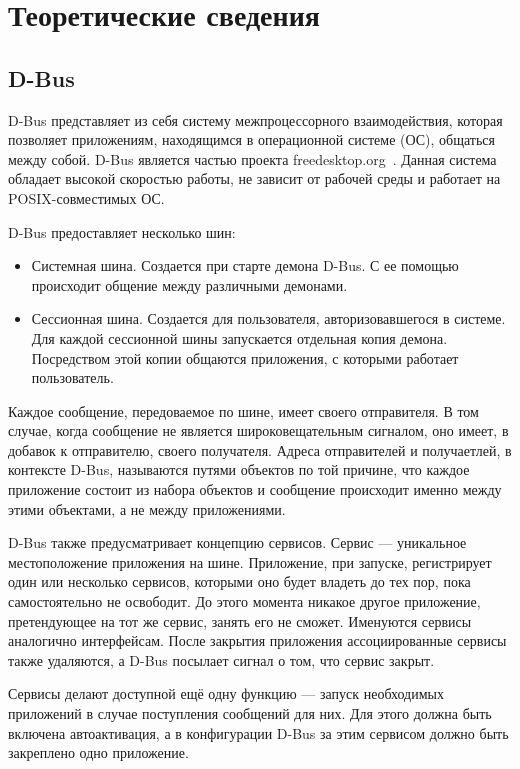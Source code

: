 \section{Теоретические сведения}
\subsection{D-Bus}
D-Bus представляет из себя систему межпроцессорного взаимодействия, которая позволяет приложениям, находящимся в операционной системе (ОС), общаться между собой. D-Bus является частью проекта freedesktop.org~\cite{freedesktop}. Данная система обладает высокой скоростью работы, не зависит от рабочей среды и работает на POSIX-совместимых ОС.

D-Bus предоставляет несколько шин:
\begin{itemize}
\item Системная шина. Создается при старте демона D-Bus. С ее помощью происходит общение между различными демонами. 
\item Сессионная шина. Создается для пользователя, авторизовавшегося в системе. Для каждой сессионной шины запускается отдельная копия демона. Посредством этой копии общаются приложения, с которыми работает пользователь.
\end{itemize}

Каждое сообщение, передоваемое по шине, имеет своего отправителя. В том случае, когда сообщение не является широковещательным сигналом, оно имеет, в добавок к отправителю, своего получателя. Адреса отправителей и получаетлей, в контексте D-Bus, называются путями объектов по той причине, что каждое приложение состоит из набора объектов и сообщение происходит именно между этими объектами, а не между приложениями.

D-Bus также предусматривает концепцию сервисов. Сервис — уникальное местоположение приложения на шине. Приложение, при запуске, регистрирует один или несколько сервисов, которыми оно будет владеть до тех пор, пока самостоятельно не освободит. До этого момента никакое другое приложение, претендующее на тот же сервис, занять его не сможет. Именуются сервисы аналогично интерфейсам. После закрытия приложения ассоциированные сервисы также удаляются, а D-Bus посылает сигнал о том, что сервис закрыт.

Сервисы делают доступной ещё одну функцию — запуск необходимых приложений в случае поступления сообщений для них. Для этого должна быть включена автоактивация, а в конфигурации D-Bus за этим сервисом должно быть закреплено одно приложение.

